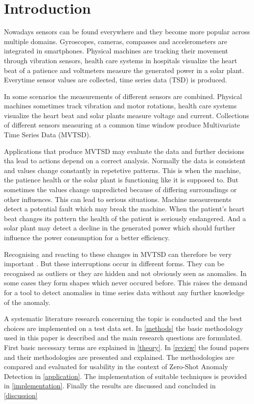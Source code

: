 \section{Introduction}\label{intro}
Nowadays sensors can be found everywhere and they become more popular across multiple domains. Gyroscopes, cameras, compasses and accelerometers are integrated in smartphones. Physical machines are tracking their movement through vibration sensors, health care systems in hospitals visualize the heart beat of a patience and voltmeters measure the generated power in a solar plant. Everytime sensor values are collected, time series data (TSD) is produced.

In some scenarios the measurements of different sensors are combined. Physical machines sometimes track vibration and motor rotations, health care systems visualize the heart beat and solar plants measure voltage and current.
Collections of different sensors measuring at a common time window produce Multivariate Time Series Data (MVTSD).

Applications that produce MVTSD may evaluate the data and further decisions tha lead to actions depend on a correct analysis.
Normally the data is consistent and values change constantly in repetetive patterns. This is when the machine, the patience health or the solar plant is functioning like it is supposed to. But sometimes the values change unpredicted because of differing surroundings or other influences. This can lead to serious situations. Machine measurements detect a potential fault which may break the machine. When the patient's heart beat changes its pattern the health of the patient is seriously endangered. And a solar plant may detect a decline in the generated power which should further influence the power consumption for a better efficiency.

Recognising and reacting to these changes in MVTSD can therefore be very important%
. But these interruptions occur in different forms. They can be recognised as outliers or they are hidden and not obviously seen as anomalies. In some cases they form shapes which never occured before. This raises the demand for a tool to detect anomalies in time series data without any further knowledge of the anomaly.


A systematic literature research concerning the topic is conducted and the best choices are implemented on a test data set. In \autoref{methods} the basic methodology used in this paper is described and the main research questions are formulated. First basic necessary terms are explained in \autoref{theory}. In \autoref{review} the found papers and their methodologies are presented and explained. The methodologies are compared and evaluated for usability in the context of Zero-Shot Anomaly Detection in \autoref{application}. The implementation of suitable techniques is provided in \autoref{implementation}. Finally the results are discussed and concluded in \autoref{discussion}
